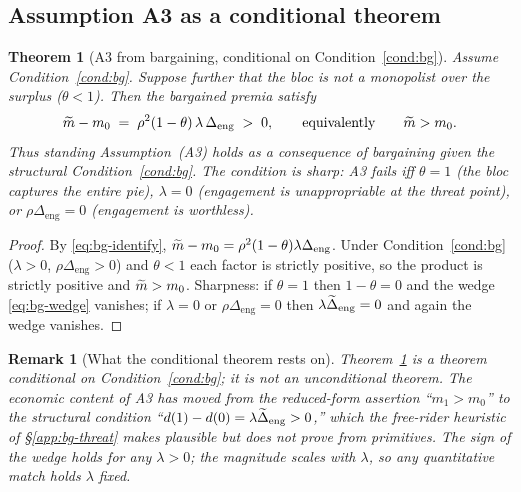 \documentclass[11pt]{article}
\newtheorem{theorem}{Theorem}
\newcommand{\1}{\mathbf{1}}
\newtheorem{remark}{Remark}
\begin{document}
\subsection{Assumption A3 as a conditional theorem}
\label{app:bg-A3}

\begin{theorem}[A3 from bargaining, conditional on Condition~\ref{cond:bg}]
\label{thm:bg-A3}
\emph{Assume Condition~\ref{cond:bg}.} Suppose further that the bloc is not a monopolist over the surplus ($\theta<1$). Then the bargained premia satisfy
\[
  \widetilde{m}-m_{0}\;=\;\rho^{2}(1-\theta)\,\lambda\,\Delta_{\mathrm{eng}}\;>\;0,
  \qquad\text{equivalently}\qquad \widetilde{m}>m_{0}.
\]
Thus standing Assumption~\textup{(A3)} holds as a \emph{consequence} of bargaining \emph{given} the structural Condition~\ref{cond:bg}. The condition is sharp: A3 fails iff $\theta=1$ (the bloc captures the entire pie), $\lambda=0$ (engagement is unappropriable at the threat point), or $\rho\Delta_{\mathrm{eng}}=0$ (engagement is worthless).
\end{theorem}

\begin{proof}
By \eqref{eq:bg-identify}, $\widetilde{m}-m_{0}=\rho^{2}(1-\theta)\lambda\Delta_{\mathrm{eng}}$. Under Condition~\ref{cond:bg} ($\lambda>0$, $\rho\Delta_{\mathrm{eng}}>0$) and $\theta<1$ each factor is strictly positive, so the product is strictly positive and $\widetilde{m}>m_{0}$. Sharpness: if $\theta=1$ then $1-\theta=0$ and the wedge \eqref{eq:bg-wedge} vanishes; if $\lambda=0$ or $\rho\Delta_{\mathrm{eng}}=0$ then $\lambda\widetilde{\Delta}_{\mathrm{eng}}=0$ and again the wedge vanishes.
\end{proof}

\begin{remark}[What the conditional theorem rests on]
\label{rem:bg-A3honest}
Theorem~\ref{thm:bg-A3} is a theorem \emph{conditional on} Condition~\ref{cond:bg}; it is \emph{not} an unconditional theorem. The economic content of A3 has moved from the reduced-form assertion ``$m_{1}>m_{0}$'' to the structural condition ``$d(1)-d(0)=\lambda\widetilde{\Delta}_{\mathrm{eng}}>0$,'' which the free-rider heuristic of \S\ref{app:bg-threat} makes plausible but does not prove from primitives. The \emph{sign} of the wedge holds for any $\lambda>0$; the \emph{magnitude} scales with $\lambda$, so any quantitative match holds $\lambda$ fixed.
\end{remark}
\end{document}
